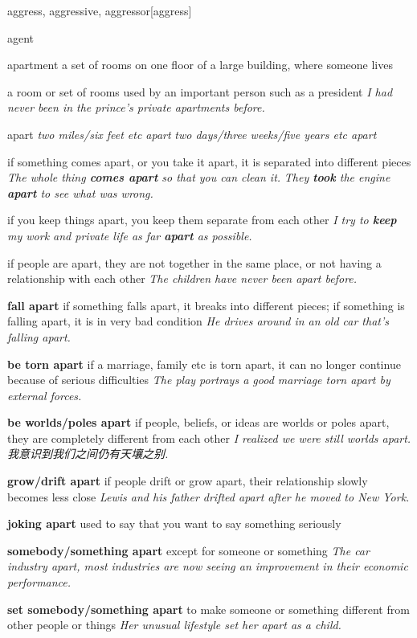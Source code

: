 \begin{DefWord}{aggress, aggressive, aggressor}[aggress]
\end{DefWord}

\begin{DefWord}{agent}
\end{DefWord}

\begin{DefWord}{apartment}
    a set of rooms on one floor of a large building, where someone lives

    a room or set of rooms used by an important person such as a president
    \textit{ I had never been in the prince's private apartments before.}
\end{DefWord}

\begin{DefWord}{apart}
    \textit{two miles/six feet etc apart}
    \textit{two days/three weeks/five years etc apart}

    if something comes apart, or you take it apart, it is separated into different pieces
    \textit{The whole thing \textbf{comes apart} so that you can clean it.}
    \textit{They \textbf{took} the engine \textbf{apart} to see what was wrong.}

    if you keep things apart, you keep them separate from each other
    \textit{I try to \textbf{keep} my work and private life as far \textbf{apart} as possible.}

    if people are apart, they are not together in the same place, or not having a relationship with each other
    \textit{The children have never been apart before.}

    \textbf{fall apart}
    if something falls apart, it breaks into different pieces;
    if something is falling apart, it is in very bad condition
    \textit{He drives around in an old car that's falling apart.}

    \textbf{be torn apart} if a marriage, family etc is torn apart, it can no longer continue because of serious difficulties
    \textit{The play portrays a good marriage torn apart by external forces.}

    \textbf{be worlds/poles apart} if people, beliefs, or ideas are worlds or poles apart, they are completely different from each other
    \textit{I realized we were still worlds apart. 我意识到我们之间仍有天壤之别. }

    \textbf{grow/drift apart} if people drift or grow apart, their relationship slowly becomes less close
    \textit{Lewis and his father drifted apart after he moved to New York.}

    \textbf{joking apart} used to say that you want to say something
    seriously

    \textbf{somebody/something apart} except for someone or something
    \textit{The car industry apart, most industries are now seeing an improvement in their economic performance.}

    \textbf{set somebody/something apart} to make someone or something different from other people or things
    \textit{Her unusual lifestyle set her apart as a child.}
\end{DefWord}

